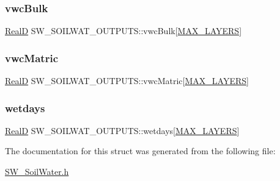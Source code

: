 \subsubsection{\texorpdfstring{vwc\+Bulk}{vwcBulk}}
{\footnotesize\ttfamily \hyperlink{generic_8h_af1c105fd5732f70b91ddaeda0cc340e3}{RealD} S\+W\+\_\+\+S\+O\+I\+L\+W\+A\+T\+\_\+\+O\+U\+T\+P\+U\+T\+S\+::vwc\+Bulk\mbox{[}\hyperlink{_s_w___defines_8h_ade9d4b2ac5f29fe89ffea40e7c58c9d6}{M\+A\+X\+\_\+\+L\+A\+Y\+E\+RS}\mbox{]}}

\mbox{\label{struct_s_w___s_o_i_l_w_a_t___o_u_t_p_u_t_s_a78733c0563f5cdc6c7086e0459ce64b1}} 
\subsubsection{\texorpdfstring{vwc\+Matric}{vwcMatric}}
{\footnotesize\ttfamily \hyperlink{generic_8h_af1c105fd5732f70b91ddaeda0cc340e3}{RealD} S\+W\+\_\+\+S\+O\+I\+L\+W\+A\+T\+\_\+\+O\+U\+T\+P\+U\+T\+S\+::vwc\+Matric\mbox{[}\hyperlink{_s_w___defines_8h_ade9d4b2ac5f29fe89ffea40e7c58c9d6}{M\+A\+X\+\_\+\+L\+A\+Y\+E\+RS}\mbox{]}}

\mbox{\label{struct_s_w___s_o_i_l_w_a_t___o_u_t_p_u_t_s_aed2dfb051dba45c3686b8ec7e507ae7c}} 
\subsubsection{\texorpdfstring{wetdays}{wetdays}}
{\footnotesize\ttfamily \hyperlink{generic_8h_af1c105fd5732f70b91ddaeda0cc340e3}{RealD} S\+W\+\_\+\+S\+O\+I\+L\+W\+A\+T\+\_\+\+O\+U\+T\+P\+U\+T\+S\+::wetdays\mbox{[}\hyperlink{_s_w___defines_8h_ade9d4b2ac5f29fe89ffea40e7c58c9d6}{M\+A\+X\+\_\+\+L\+A\+Y\+E\+RS}\mbox{]}}



The documentation for this struct was generated from the following file\+:\begin{DoxyCompactItemize}
\item 
\hyperlink{_s_w___soil_water_8h}{S\+W\+\_\+\+Soil\+Water.\+h}\end{DoxyCompactItemize}
